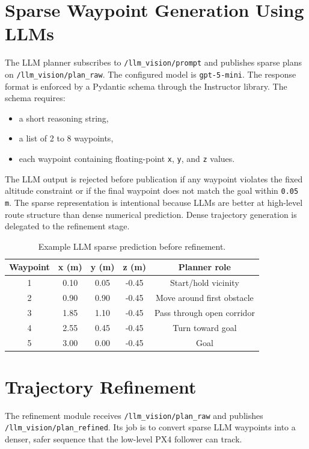 \documentclass[11pt]{article}
\begin{document}
\section{Sparse Waypoint Generation Using LLMs}

The LLM planner subscribes to \texttt{/llm\_vision/prompt} and publishes sparse plans on \texttt{/llm\_vision/plan\_raw}. The configured model is \texttt{gpt-5-mini}. The response format is enforced by a Pydantic schema through the Instructor library. The schema requires:

\begin{itemize}
  \item a short reasoning string,
  \item a list of 2 to 8 waypoints,
  \item each waypoint containing floating-point \texttt{x}, \texttt{y}, and \texttt{z} values.
\end{itemize}

The LLM output is rejected before publication if any waypoint violates the fixed altitude constraint or if the final waypoint does not match the goal within \texttt{0.05 m}. The sparse representation is intentional because LLMs are better at high-level route structure than dense numerical prediction. Dense trajectory generation is delegated to the refinement stage.

\begin{table}[H]
\centering
\caption{Example LLM sparse prediction before refinement.}
\label{tab:llm-example}
\begin{tabular}{ccccc}
\toprule
Waypoint & x (m) & y (m) & z (m) & Planner role \\
\midrule
1 & 0.10 & 0.05 & -0.45 & Start/hold vicinity \\
2 & 0.90 & 0.90 & -0.45 & Move around first obstacle \\
3 & 1.85 & 1.10 & -0.45 & Pass through open corridor \\
4 & 2.55 & 0.45 & -0.45 & Turn toward goal \\
5 & 3.00 & 0.00 & -0.45 & Goal \\
\bottomrule
\end{tabular}
\end{table}

\section{Trajectory Refinement}

The refinement module receives \texttt{/llm\_vision/plan\_raw} and publishes \texttt{/llm\_vision/plan\_refined}. Its job is to convert sparse LLM waypoints into a denser, safer sequence that the low-level PX4 follower can track.
\end{document}
